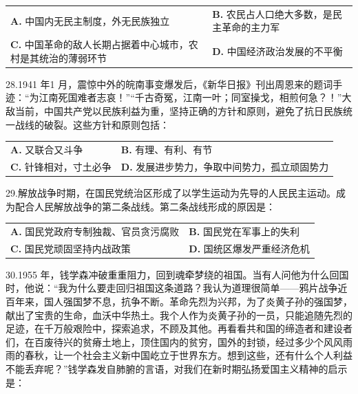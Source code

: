 \documentclass[UTF8,11pt]{ctexart}
\begin{document}
\begin{center}\begin{tabular}{>{\raggedright\arraybackslash}p{\dimexpr(\linewidth-4\tabcolsep)/2\relax}>{\raggedright\arraybackslash}p{\dimexpr(\linewidth-4\tabcolsep)/2\relax}}
\textbf{A.} 中国内无民主制度，外无民族独立 & \textbf{B.} 农民占人口绝大多数，是民主革命的主力军\\[.35em]
\textbf{C.} 中国革命的敌人长期占据着中心城市，农村是其统治的薄弱环节 & \textbf{D.} 中国经济政治发展的不平衡\\[.35em]\end{tabular}\end{center}

28.1941 年1 月，震惊中外的皖南事变爆发后，《新华日报》刊出周恩来的题词手迹：“为江南死国难者志哀！”“千古奇冤，江南一叶；同室操戈，相煎何急？！”大敌当前，中国共产党以民族利益为重，坚持正确的方针和原则，避免了抗日民族统一战线的破裂。这些方针和原则包括：


\begin{center}\begin{tabular}{>{\raggedright\arraybackslash}p{\dimexpr(\linewidth-4\tabcolsep)/2\relax}>{\raggedright\arraybackslash}p{\dimexpr(\linewidth-4\tabcolsep)/2\relax}}
\textbf{A.} 又联合又斗争 & \textbf{B.} 有理、有利、有节\\[.35em]
\textbf{C.} 针锋相对，寸土必争 & \textbf{D.} 发展进步势力，争取中间势力，孤立顽固势力\\[.35em]\end{tabular}\end{center}

29.解放战争时期，在国民党统治区形成了以学生运动为先导的人民民主运动。成为配合人民解放战争的第二条战线。第二条战线形成的原因是：


\begin{center}\begin{tabular}{>{\raggedright\arraybackslash}p{\dimexpr(\linewidth-4\tabcolsep)/2\relax}>{\raggedright\arraybackslash}p{\dimexpr(\linewidth-4\tabcolsep)/2\relax}}
\textbf{A.} 国民党政府专制独裁、官员贪污腐败 & \textbf{B.} 国民党在军事上的失利\\[.35em]
\textbf{C.} 国民党顽固坚持内战政策 & \textbf{D.} 国统区爆发严重经济危机\\[.35em]\end{tabular}\end{center}

30.1955 年，钱学森冲破重重阻力，回到魂牵梦绕的祖国。当有人问他为什么回国时，他说：“我为什么要走回归祖国这条道路？我认为道理很简单——鸦片战争近百年来，国人强国梦不息，抗争不断。革命先烈为兴邦，为了炎黄子孙的强国梦，献出了宝贵的生命，血沃中华热土。我个人作为炎黄子孙的一员，只能追随先烈的足迹，在千万般艰险中，探索追求，不顾及其他。再看看共和国的缔造者和建设者们，在百废待兴的贫瘠土地上，顶住国内的贫穷，国外的封锁，经过多少个风风雨雨的春秋，让一个社会主义新中国屹立于世界东方。想到这些，还有什么个人利益不能丢弃呢？”钱学森发自肺腑的言语，对我们在新时期弘扬爱国主义精神的启示是：
\end{document}
